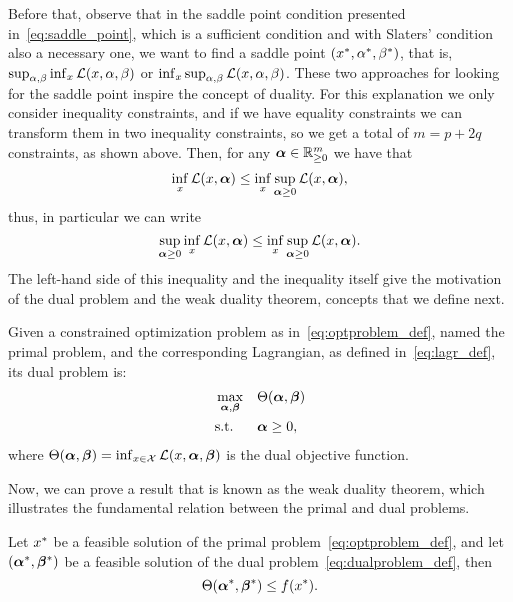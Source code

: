 %
Before that, observe that in the saddle point condition presented in~\eqref{eq:saddle_point}, which is a sufficient condition and with Slaters' condition also a necessary one, we want to find a saddle point $({x}^*, {\alpha}^*, {\beta}^*)$, 
%
that is, $\sup_{\alpha, \beta} \inf_{x} \mathcal{L}(x, \alpha, \beta)$ or $\inf_{x} \sup_{\alpha, \beta} \mathcal{L}(x, \alpha, \beta)$. 
%
These two approaches for looking for the saddle point inspire the concept of duality.
%
For this explanation we only consider inequality constraints, and if we have equality constraints we can transform them in two inequality constraints, so we get a total of $m = p + 2q$ constraints, as shown above. Then, for any $\bm{\alpha} \in \mathbb{R}^m_{\geq 0}$ we have that
\begin{equation}
    \nonumber
    \inf_{x} \mathcal{L}(x, \bm{\alpha}) \leq \inf_{x} \sup_{\bm{\alpha} \geq 0} \mathcal{L}(x, \bm{\alpha}),
\end{equation}
thus, in particular we can write
\begin{equation}
    \label{eq:lagr_weakth}
    \sup_{\fv{\alpha} \geq 0} \inf_{x} \lagr(x, \fv{\alpha}) \leq \inf_{x} \sup_{\fv{\alpha} \geq 0} \lagr(x, \fv{\alpha}).
\end{equation}
The left-hand side of this inequality and the inequality itself give the motivation of the dual problem and the weak duality theorem, concepts that we define next.
%
\begin{definition}\label{def:dual_problem}
    Given a constrained optimization problem as in~\eqref{eq:optproblem_def}, named the primal problem, and the corresponding Lagrangian, as defined in~\eqref{eq:lagr_def}, its dual problem is:
    \begin{equation}\label{eq:dualproblem_def}
        \begin{aligned}
            &\max_{\fv{\alpha}, \fv{\beta}} & & \Theta(\fv{\alpha}, \fv{\beta}) \\
            & \text{s.t.} & & \fv{\alpha} \geq 0 ,          
        \end{aligned}  
    \end{equation}
    where $\Theta(\bm{\alpha}, \bm{\beta}) = \inf_{x \in \mathcal{X}}\mathcal{L}(x, \bm{\alpha}, \bm{\beta})$ is the dual objective function.
\end{definition}
%
Now, we can prove a result that is known as the weak duality theorem, which illustrates the fundamental relation between the primal and dual problems.
%
\begin{theorem}
    Let ${x}^*$ be a feasible solution of the primal problem~\eqref{eq:optproblem_def}, and let $({\bm{\alpha}}^*, {\bm{\beta}}^*)$ be a feasible solution of the dual problem~\eqref{eq:dualproblem_def}, then 
    $$ \Theta({\bm{\alpha}}^*, {\bm{\beta}}^*) \leq f({x}^*) .$$
\end{theorem}
